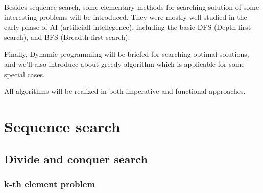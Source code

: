 \documentclass{article}
\begin{document}
Besides sequence search, some elementary methods for searching
solution of some interesting problems will be introduced. They
were mostly well studied in the early phase of AI (artificiall
intellegence), including the basic DFS (Depth first search), 
and BFS (Breadth first search).

Finally, Dynamic programming will be briefed for searching
optimal solutions, and we'll also introduce about greedy
algorithm which is applicable for some special cases.

All algorithms will be realized in both imperative and functional
approaches.

\section{Sequence search}



\subsection{Divide and conquer search}

\subsubsection{k-th element problem}
\end{document}

